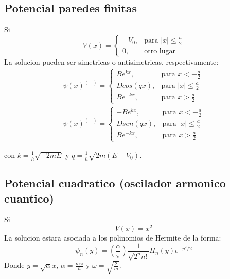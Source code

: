 \documentclass[a4paper, twocolumn, 10pt]{article}
\begin{document}
\subsection{Potencial paredes finitas}
 Si 
    \begin{equation}
        V(x) = 
        \left \{
        \begin{array}{ll}
            -V_{0}, & \textrm{para  } |x| \leq \frac{a}{2} \\
            0, & \textrm{otro lugar} 
        \end{array}
        \right.
    \end{equation}
La solucion pueden ser simetricas o antisimetricas, respectivamente:
\begin{eqnarray}
    \psi(x)^{(+)} = 
        \left \{
        \begin{array}{ll}
            Be^{kx}, & \textrm{para  } x < -\frac{a}{2} \\
            Dcos(qx), & \textrm{para  } |x| \leq \frac{a}{2} \\
            Be^{-kx}, & \textrm{para  } x > \frac{a}{2}
        \end{array}
        \right. \\
    \psi(x)^{(-)} = 
        \left \{
        \begin{array}{ll}
            -Be^{kx}, & \textrm{para  } x < -\frac{a}{2} \\
            Dsen(qx), & \textrm{para  } |x| \leq \frac{a}{2} \\
            Be^{-kx}, & \textrm{para  } x > \frac{a}{2}
        \end{array}
        \right.
\end{eqnarray}

con $k = \frac{1}{\hbar} \sqrt{-2mE}$ y $q = \frac{1}{\hbar} \sqrt{2m(E-V_{0})}$.

\subsection{Potencial cuadratico (oscilador armonico cuantico)} 
    Si
    \begin{equation}
        V(x) = x^{2}
    \end{equation}
    La solucion estara asociada a los polinomios de Hermite de la forma:
    \begin{equation}
        \psi_{n}(y) = (\frac{\alpha}{\pi}) \frac{1}{\sqrt{2^{n}n!}} H_{n}(y)e^{-y^{2}/2}
    \end{equation}
    Donde $y = \sqrt{\alpha} x$, $\alpha = \frac{m\omega}{\hbar}$ y $\omega = \sqrt{\frac{2}{m}}$.
    
\end{document}
